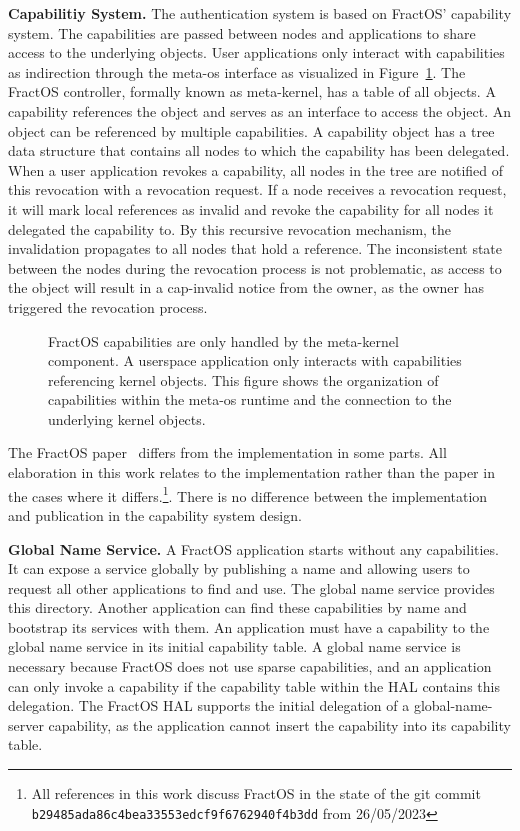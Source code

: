 \textbf{Capabilitiy System.}
The authentication system is based on FractOS' capability system.
The capabilities are passed between nodes and applications to share access to the underlying objects. User applications only interact with capabilities as indirection through the meta-os interface as visualized in Figure~\ref{fig:cap-orga}\@. The FractOS controller, formally known as meta-kernel, has a table of all objects. A capability references the object and serves as an interface to access the object. An object can be referenced by multiple capabilities. A capability object has a tree data structure that contains all nodes to which the capability has been delegated. When a user application revokes a capability, all nodes in the tree are notified of this revocation with a revocation request. If a node receives a revocation request, it will mark local references as invalid and revoke the capability for all nodes it delegated the capability to. By this recursive revocation mechanism, the invalidation propagates to all nodes that hold a reference. The inconsistent state between the nodes during the revocation process is not problematic, as access to the object will result in a cap-invalid notice from the owner, as the owner has triggered the revocation process.

\begin{figure}[H]
  \centering
  
  \caption{\label{fig:cap-orga} FractOS capabilities are only handled by the meta-kernel component. A userspace application only interacts with capabilities referencing kernel objects. This figure shows the organization of capabilities within the meta-os runtime and the connection to the underlying kernel objects.}
\end{figure}

The FractOS paper~\cite{vilanovaSlashingDisaggregationTax2022} differs from the implementation in some parts. All elaboration in this work relates to the implementation rather than the paper in the cases where it differs.\footnote{All references in this work discuss FractOS in the state of the git commit \texttt{b29485ada86c4bea33553edcf9f6762940f4b3dd} from 26/05/2023}. There is no difference between the implementation and publication in the capability system design.

\textbf{Global Name Service.}
A FractOS application starts without any capabilities. It can expose a service globally by publishing a name and allowing users to request all other applications to find and use. The global name service provides this directory. Another application can find these capabilities by name and bootstrap its services with them. An application must have a capability to the global name service in its initial capability table. A global name service is necessary because FractOS does not use sparse capabilities, and an application can only invoke a capability if the capability table within the \ac{HAL} contains this delegation. The FractOS \ac{HAL} supports the initial delegation of a global-name-server capability, as the application cannot insert the capability into its capability table.

